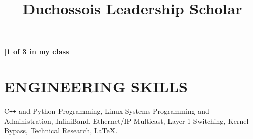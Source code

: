 \documentclass{res}
\begin{document}
\begin{resume}
\title{{\bf Duchossois Leadership Scholar}}
\begin{position}
   {\bf [1 of 3 in my class]}
\end{position}
 
\section{ENGINEERING SKILLS}
C\texttt{++} and Python Programming, Linux Systems Programming and Administration, InfiniBand, Ethernet/IP Multicast, Layer 1 Switching, Kernel Bypass, Technical Research, \LaTeX{}.
 
\end{resume}
\end{document}
